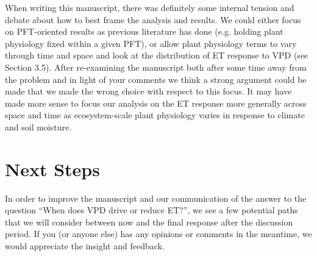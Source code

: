 \documentclass[12pt]{article}
\begin{document}
When writing this manuscript, there was definitely some internal
tension and debate about how to best frame the analysis and
results. We could either focus on PFT-oriented results as previous
literature has done (e.g. holding plant physiology fixed within a
given PFT), or allow plant physiology terms to vary through time and
space and look at the distribution of ET response to VPD (see Section
3.5). After re-examining the manuscript both after some time away from
the problem and in light of your comments we think a strong argument
could be made that we made the wrong choice with respect to this
focus. It may have made more sense to focus our analysis on the ET
response more generally across space and time as ecosystem-scale plant
physiology varies in response to climate and soil moisture.

\section{Next Steps}

In order to improve the manuscript and our communication of the answer to
the question ``When does VPD drive or reduce ET?'', we see a few
potential paths that we will consider between now and the final
response after the discussion period. If you (or anyone else) has any
opinions or comments in the meantime, we would appreciate the insight
and feedback.
\end{document}
